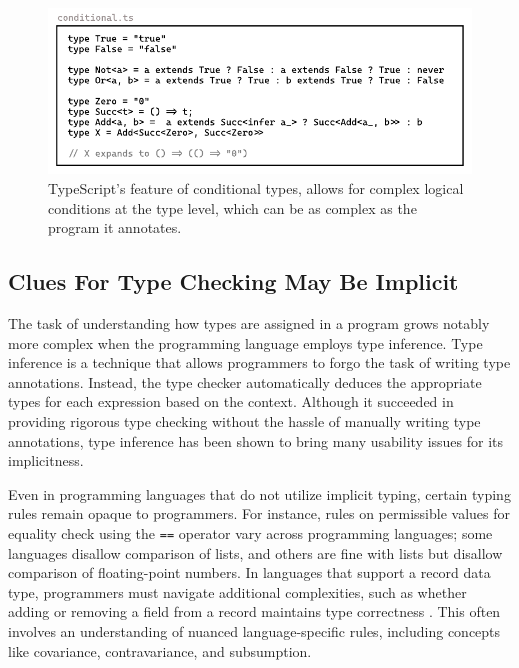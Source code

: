 \begin{figure}[hbt]
  \includegraphics[width=\linewidth]{Conditional}
  \caption{
    \label{fig:ts-conditional}
  TypeScript's feature of conditional types, allows for complex logical conditions at the type level, which can be as complex as the program it annotates.
    }
\end{figure}

\subsection{Clues For Type Checking May Be Implicit}

The task of understanding how types are assigned in a program grows notably more complex when the programming language employs type inference. Type inference \cite{Damas1982-sc} is a technique that allows programmers to forgo the task of writing type annotations. Instead, the type checker automatically deduces the appropriate types for each expression based on the context. Although it succeeded in providing rigorous type checking without the hassle of manually writing type annotations, type inference has been shown to bring many usability issues \cite{Jun2002-xp, Wand1986-lu} for its implicitness.  

Even in programming languages that do not utilize implicit typing, certain typing rules remain opaque to programmers. For instance, rules on permissible values for equality check using the \texttt{==} operator vary across programming languages; some languages disallow comparison of lists, and others are fine with lists but disallow comparison of floating-point numbers. In languages that support a record data type, programmers must navigate additional complexities, such as whether adding or removing a field from a record maintains type correctness \cite{fig:row-polymophism}. This often involves an understanding of nuanced language-specific rules, including concepts like covariance, contravariance, and subsumption.


